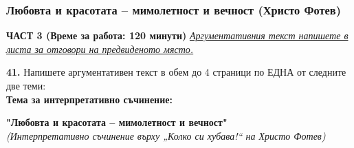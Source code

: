 \documentclass[12pt,a4paper]{article}
\begin{document}
\subsubsection{Любовта и красотата – мимолетност и вечност (Христо Фотев)}
\vspace{0.5cm}
\begin{center}
\textbf{ЧАСТ 3 (Време за работа: 120 минути)}
\vspace{0.2cm}
{\textit{\underline{Аргументативния текст напишете в листа за отговори на предвиденото място.}}}
\vspace{0.1cm}
\end{center}
\textbf{41.} Напишете аргументативен текст в обем до 4 страници по ЕДНА от следните две теми:
\\
\vspace{0.2cm}
\textbf{Тема за интерпретативно съчинение:}
\vspace{0.1cm}
\begin{center}
\textbf{"Любовта и красотата – мимолетност и вечност"}
\\
\textit{(Интерпретативно съчинение върху „Колко си хубава!“ на Христо Фотев)}
\end{center}
\end{document}
